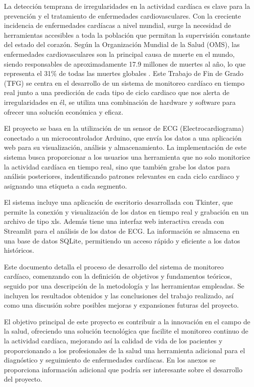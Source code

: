 

La detección temprana de irregularidades en la actividad cardíaca es clave para la prevención y el tratamiento de enfermedades cardiovasculares. Con la creciente incidencia de enfermedades cardíacas a nivel mundial, surge la necesidad de herramientas accesibles a toda la población que permitan la supervisión constante del estado del corazón. Según la Organización Mundial de la Salud (OMS), las enfermedades cardiovasculares son la principal causa de muerte en el mundo, siendo responsables de aproximadamente 17.9 millones de muertes al año, lo que representa el 31\% de todas las muertes globales \cite{who-cvd}. Este Trabajo de Fin de Grado (TFG) se centra en el desarrollo de un sistema de monitoreo cardíaco en tiempo real junto a una predicción de cada tipo de ciclo cardiaco que nos alerta de irregularidades en él, se utiliza una combinación de hardware y software para ofrecer una solución económica y eficaz.


El proyecto se basa en la utilización de un sensor de ECG (Electrocardiograma) conectado a un microcontrolador Arduino, que envía los datos a una aplicación web para su visualización, análisis y almacenamiento. La implementación de este sistema busca proporcionar a los usuarios una herramienta que no solo monitorice la actividad cardíaca en tiempo real, sino que también grabe los datos para análisis posteriores, indentificando patrones relevantes en cada ciclo cardiaco y asignando una etiqueta a cada segmento.

El sistema incluye una aplicación de escritorio desarrollada con Tkinter, que permite la conexión y visualización de los datos en tiempo real y grabación en un archivo de tipo xls. Además tiene una interfaz web interactiva creada con Streamlit para el análisis de los datos de ECG. La información se almacena en una base de datos SQLite, permitiendo un acceso rápido y eficiente a los datos históricos.

Este documento detalla el proceso de desarrollo del sistema de monitoreo cardíaco, comenzando con la definición de objetivos y fundamentos teóricos, seguido por una descripción de la metodología y las herramientas empleadas. Se incluyen los resultados obtenidos y las conclusiones del trabajo realizado, así como una discusión sobre posibles mejoras y expansiones futuras del proyecto.

El objetivo principal de este proyecto es contribuir a la innovación en el campo de la salud, ofreciendo una solución tecnológica que facilite el monitoreo continuo de la actividad cardíaca, mejorando así la calidad de vida de los pacientes y proporcionando a los profesionales de la salud una herramienta adicional para el diagnóstico y seguimiento de enfermedades cardíacas. En los anexos se proporciona información adicional que podría ser interesante sobre el desarrollo del proyecto.




